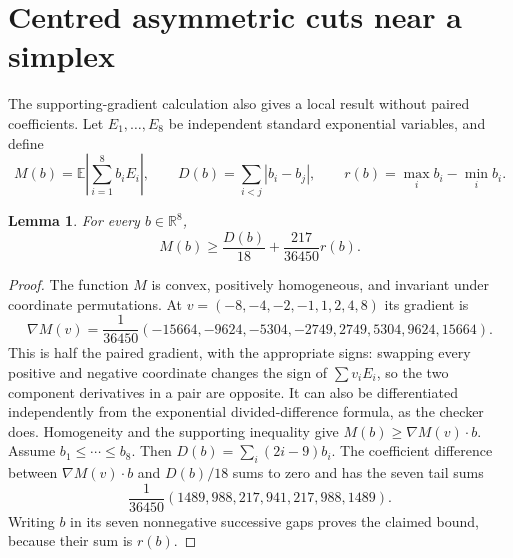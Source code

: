 \documentclass[11pt,a4paper]{article}
\newcommand{\E}{\mathbb E}
\newtheorem{lemma}[proposition]{Lemma}
\begin{document}
\section{Centred asymmetric cuts near a simplex}
The supporting-gradient calculation also gives a local result without
paired coefficients. Let $E_1,\ldots,E_8$ be independent standard
exponential variables, and define
\[
 M(b)=\E\left|\sum_{i=1}^8 b_iE_i\right|,\qquad
 D(b)=\sum_{i<j}|b_i-b_j|,\qquad
 r(b)=\max_i b_i-\min_i b_i.
\]
\begin{lemma}\label{lem:asymmetric-mean}
For every $b\in\mathbb R^8$,
\begin{equation}\label{eq:asymmetric-mean}
 M(b)\ge\frac{D(b)}{18}+\frac{217}{36450}r(b).
\end{equation}
\end{lemma}
\begin{proof}
The function $M$ is convex, positively homogeneous, and invariant under
coordinate permutations. At $v=(-8,-4,-2,-1,1,2,4,8)$ its gradient is
\[
 \nabla M(v)=\frac1{36450}
 (-15664,-9624,-5304,-2749,2749,5304,9624,15664).
\]
This is half the paired gradient, with the appropriate signs: swapping
every positive and negative coordinate changes the sign of
$\sum v_iE_i$, so the two component derivatives in a pair are opposite.
It can also be differentiated independently from the exponential
divided-difference formula, as the checker does. Homogeneity and the
supporting inequality give $M(b)\ge\nabla M(v)\cdot b$.
Assume $b_1\le\cdots\le b_8$. Then
$D(b)=\sum_i(2i-9)b_i$. The coefficient difference between
$\nabla M(v)\cdot b$ and $D(b)/18$ sums to zero and has the seven
tail sums
\[
 \frac1{36450}(1489,988,217,941,217,988,1489).
\]
Writing $b$ in its seven nonnegative successive gaps proves the claimed
bound, because their sum is $r(b)$.
\end{proof}
\end{document}

